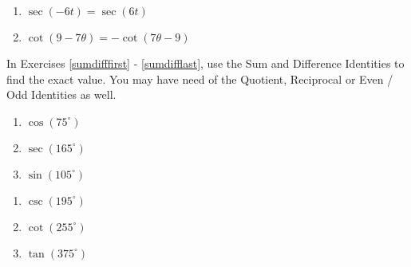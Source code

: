 \begin{multicols}{2}

\begin{enumerate}

\setcounter{enumi}{\value{HW}}

\item $\sec(-6t) = \sec(6t)$
\item $\cot(9 - 7\theta) = -\cot(7\theta - 9)$ \label{evenoddlast}

\setcounter{HW}{\value{enumi}}

\end{enumerate}

\end{multicols}

In Exercises \ref{sumdifffirst} - \ref{sumdifflast}, use the Sum and Difference Identities to find the exact value.  You may have need of the Quotient, Reciprocal or Even / Odd Identities as well.

\begin{multicols}{3}

\begin{enumerate}

\setcounter{enumi}{\value{HW}}

\item  \label{cos75} $\cos(75^{\circ})$ \label{sumdifffirst} 
\item  $\sec(165^{\circ})$
\item  \label{sin105} $\sin(105^{\circ})$

\setcounter{HW}{\value{enumi}}

\end{enumerate}

\end{multicols}

\begin{multicols}{3}

\begin{enumerate}

\setcounter{enumi}{\value{HW}}

\item  $\csc(195^{\circ})$
\item  $\cot(255^{\circ})$
\item  $\tan(375^{\circ})$

\setcounter{HW}{\value{enumi}}

\end{enumerate}

\end{multicols}

